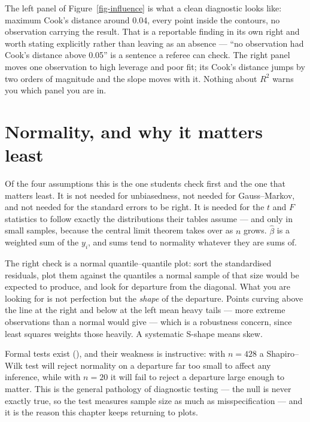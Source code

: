 \documentclass[
  letterpaper,
  10pt,
  twoside,
  openright,
  numbers=noenddot,
  chapterprefix=true]{scrbook}
\begin{document}
The left panel of Figure~\ref{fig-influence} is what a clean diagnostic
looks like: maximum Cook's distance around 0.04, every point inside the
contours, no observation carrying the result. That is a reportable
finding in its own right and worth stating explicitly rather than
leaving as an absence --- ``no observation had Cook's distance above
0.05'' is a sentence a referee can check. The right panel moves one
observation to high leverage and poor fit; its Cook's distance jumps by
two orders of magnitude and the slope moves with it. Nothing about
\(R^2\) warns you which panel you are in.

\section{Normality, and why it matters
least}\label{normality-and-why-it-matters-least}

Of the four assumptions this is the one students check first and the one
that matters least. It is not needed for unbiasedness, not needed for
Gauss--Markov, and not needed for the standard errors to be right. It is
needed for the \(t\) and \(F\) statistics to follow exactly the
distributions their tables assume --- and only in small samples, because
the central limit theorem takes over as \(n\) grows. \(\hat\beta\) is a
weighted sum of the \(y_i\), and sums tend to normality whatever they
are sums of.

The right check is a normal quantile--quantile plot: sort the
standardised residuals, plot them against the quantiles a normal sample
of that size would be expected to produce, and look for departure from
the diagonal. What you are looking for is not perfection but the
\emph{shape} of the departure. Points curving above the line at the
right and below at the left mean heavy tails --- more extreme
observations than a normal would give --- which is a robustness concern,
since least squares weights those heavily. A systematic S-shape means
skew.

Formal tests exist (),
and their weakness is instructive: with \(n = 428\) a Shapiro--Wilk test
will reject normality on a departure far too small to affect any
inference, while with \(n = 20\) it will fail to reject a departure
large enough to matter. This is the general pathology of diagnostic
testing --- the null is never exactly true, so the test measures sample
size as much as misspecification --- and it is the reason this chapter
keeps returning to plots.
\end{document}
